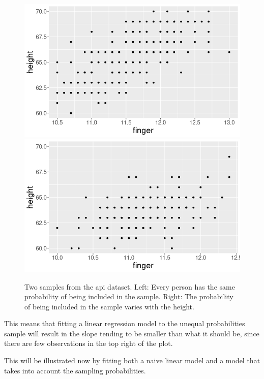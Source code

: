 \documentclass{article}
\begin{document}
\begin{example}
\begin{figure}
  \label{fig:apiSamples}
  \includegraphics[scale = 0.4]{example1_SRS.png}
  \includegraphics[scale = 0.4]{example1_UNEQ.png}
  \caption{Two samples from the api dataset. Left: Every person has the same
    probability of being included in the sample. Right: The probability of being
  included in the sample varies with the height.}
\end{figure}


This means that fitting a linear regression model to the unequal probabilities
sample will result in the slope tending to be smaller than what it should be, since there are few observations in the top right of the plot.

This will be illustrated now by fitting both a naive linear model and a model that takes into account the sampling probabilities.



\end{example}
\end{document}
